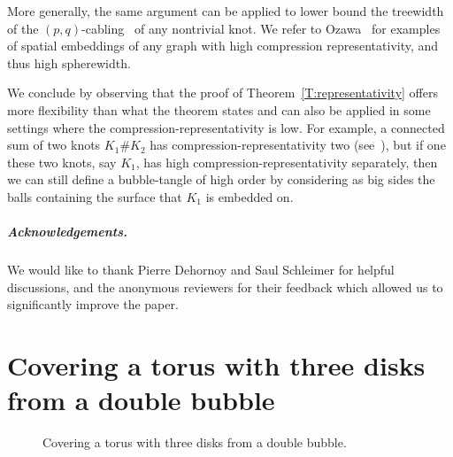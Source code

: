 \documentclass[11pt,a4paper]{article}
\newcommand{\control}[2]{ ($#2+#1$) .. #1}
\begin{document}
More generally, the same argument can be applied to lower bound the treewidth of the $(p,q)$-cabling~\cite[Section~5.2]{knotbook} of any nontrivial knot. We refer to Ozawa~\cite[Theorem~6]{ozawa} for examples of spatial embeddings of any graph with high compression representativity, and thus high spherewidth.


We conclude by observing that the proof of Theorem~\ref{T:representativity} offers more flexibility than what the theorem states and can also be applied in some settings where the compression-representativity is low. For example, a connected sum of two knots $K_1 \# K_2$ has compression-representativity two (see~\cite[Corollary~9]{ozawa}), but if one these two knots, say $K_1$, has high compression-representativity separately, then we can still define a bubble-tangle of high order by considering as big sides the balls containing the surface that $K_1$ is embedded on.

\subparagraph*{Acknowledgements.} We would like to thank Pierre Dehornoy and Saul Schleimer for helpful discussions, and the anonymous reviewers for their feedback which allowed us to significantly improve the paper.





\appendix

\section{Covering a torus with three disks from a double bubble}\label{A:torus}

\begin{figure}[ht]
\begin{center}
\end{center}
\caption{Covering a torus with three disks from a double bubble.}
\label{pic_torus_3_disks}
\end{figure}
\end{document}
